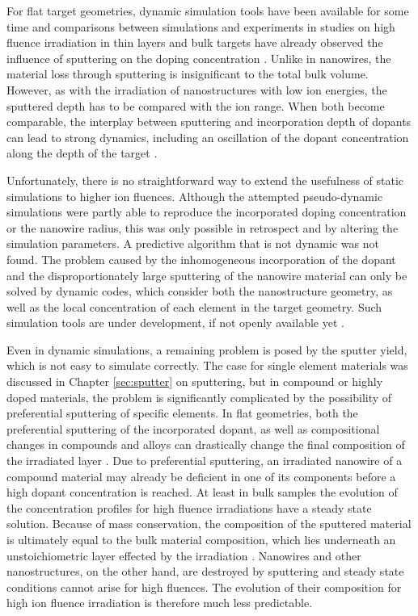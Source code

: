 For flat target geometries, dynamic simulation tools have been available for some time \cite{moller_tridyn_1984,moller_tridyn-binary_1988} and comparisons between simulations and experiments in studies on high fluence irradiation in thin layers and bulk targets have already observed the influence of sputtering on the doping concentration \cite{miyagawa_computer_1991,sigmund_alloy_1993}. Unlike in nanowires, the material loss through sputtering is insignificant to the total bulk volume. However, as with the irradiation of nanostructures with low ion energies, the sputtered depth has to be compared with the ion range. When both become comparable, the interplay between sputtering and incorporation depth of dopants can lead to strong dynamics, including an oscillation of the dopant concentration along the depth of the target \cite{eckstein_oscillations_2000}. 

Unfortunately, there is no straightforward way to extend the usefulness of static simulations to higher ion fluences. Although the attempted pseudo-dynamic simulations were partly able to reproduce the incorporated doping concentration or the nanowire radius, this was only possible in retrospect and by altering the simulation parameters. A predictive algorithm that is not dynamic was not found. The problem caused by the inhomogeneous incorporation of the dopant and the disproportionately large sputtering of the nanowire material can only be solved by dynamic codes, which consider both the nanostructure geometry, as well as the local concentration of each element in the target geometry. Such simulation tools are under development, if not openly available yet \cite{moller_tri3dyn_2014}.

Even in dynamic simulations, a remaining problem is posed by the sputter yield, which is not easy to simulate correctly. The case for single element materials was discussed in Chapter \ref{sec:sputter} on sputtering, but in compound or highly doped materials, the problem is significantly complicated by the possibility of preferential sputtering of specific elements. In flat geometries, both the preferential sputtering of the incorporated dopant, as well as compositional changes in compounds and alloys can drastically change the final composition of the irradiated layer \cite{kelly_attempt_1978,moller_tridyn_1984,andersen_computer_1986,moller_tridyn-binary_1988,sigmund_alloy_1993,zaporozchenko_preferential_1995}. Due to preferential sputtering, an irradiated nanowire of a compound material may already be deficient in one of its components before a high dopant concentration is reached. At least in bulk samples the evolution of the concentration profiles for high fluence irradiations have a steady state solution. Because of mass conservation, the composition of the sputtered material is ultimately equal to the bulk material composition, which lies underneath an unstoichiometric layer effected by the irradiation \cite{andersen_computer_1986}. Nanowires and other nanostructures, on the other hand, are destroyed by sputtering and steady state conditions cannot arise for high fluences. The evolution of their composition for high ion fluence irradiation is therefore much less predictable.
